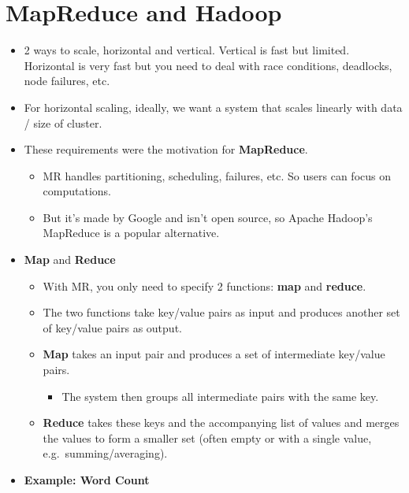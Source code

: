 %


\section{MapReduce and Hadoop}
\begin{multicols}{2}
\begin{itemize}
\item
  2 ways to scale, horizontal and vertical. Vertical is fast but
  limited. Horizontal is very fast but you need to deal with race
  conditions, deadlocks, node failures, etc.
\item
  For horizontal scaling, ideally, we want a system that scales linearly
  with data / size of cluster.
\item
  These requirements were the motivation for \textbf{MapReduce}.

  \begin{itemize}
    \item
    MR handles partitioning, scheduling, failures, etc. So users can
    focus on computations.
  \item
    But it's made by Google and isn't open source, so Apache Hadoop's
    MapReduce is a popular alternative.
  \end{itemize}
\item
  \textbf{Map} and \textbf{Reduce}

  \begin{itemize}
    \item
    With MR, you only need to specify 2 functions: \textbf{map} and
    \textbf{reduce}.
  \item
    The two functions take key/value pairs as input and produces another
    set of key/value pairs as output.
  \item
    \textbf{Map} takes an input pair and produces a set of intermediate
    key/value pairs.

    \begin{itemize}
        \item
      The system then groups all intermediate pairs with the same key.
    \end{itemize}
  \item
    \textbf{Reduce} takes these keys and the accompanying list of values
    and merges the values to form a smaller set (often empty or with a
    single value, e.g.~summing/averaging).
  \end{itemize}
\item
  \textbf{Example: Word Count}
\end{itemize}


\end{multicols}
